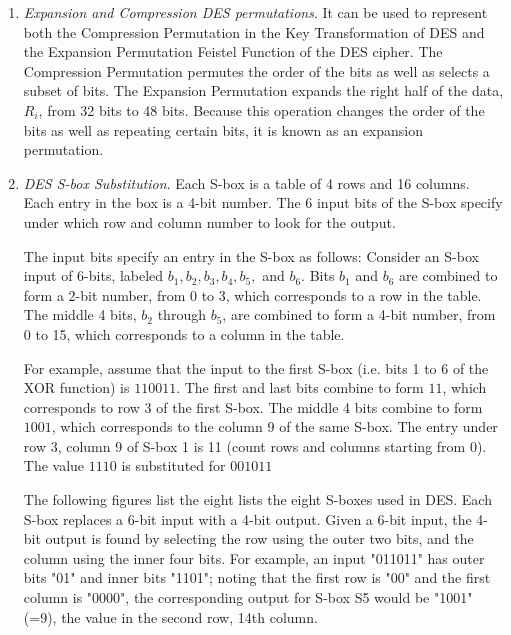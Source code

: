 \begin{enumerate}

\item \textit{Expansion and Compression DES permutations}. It can be used to represent both the Compression Permutation in the Key Transformation of DES and the Expansion Permutation Feistel Function of the DES cipher. The Compression Permutation permutes the order of the bits as well as selects a subset of bits. The Expansion Permutation expands the right half of the data, $R_i$, from 32 bits to 48 bits. Because this operation changes the order of the bits as well as repeating certain bits, it is known as an expansion permutation. 

\item \textit{DES S-box Substitution}. Each S-box is a table of 4 rows and 16 columns. Each entry in the box is a 4-bit number.
The 6 input bits of the S-box specify under which row and column number to look for the output.

The input bits specify an entry in the S-box as follows: Consider an S-box input of 6-bits,
labeled $b_1, b_2, b_3, b_4, b_5,$ and $b_6$. Bits $b_1$ and $b_6$ are combined to form a 2-bit
number, from 0 to 3, which corresponds to a row in the table. The middle 4 bits, $b_2$ through
$b_5$, are combined to form a 4-bit number, from 0 to 15, which corresponds to a column in the table.

For example, assume that the input to the first S-box (i.e. bits 1 to 6 of the XOR function) is 
$110011$. The first and last bits combine to form $11$, which corresponds to row 3 of the first S-box.
The middle 4 bits combine to form $1001$, which corresponds to the column 9 of the same S-box. 
The entry under row 3, column 9 of S-box 1 is 11 (count rows and columns starting from 0).
The value $1110$ is substituted for $001011$

The following figures list the eight lists the eight S-boxes used in DES. Each S-box replaces a 6-bit input with a 4-bit output. Given a 6-bit input, the 4-bit output is found by selecting the row using the outer two bits, and the column using the inner four bits. For example, an input "011011" has outer bits "01" and inner bits "1101"; noting that the first row is "00" and the first column is "0000", the corresponding output for S-box S5 would be "1001" (=9), the value in the second row, 14th column.


\end{enumerate}
